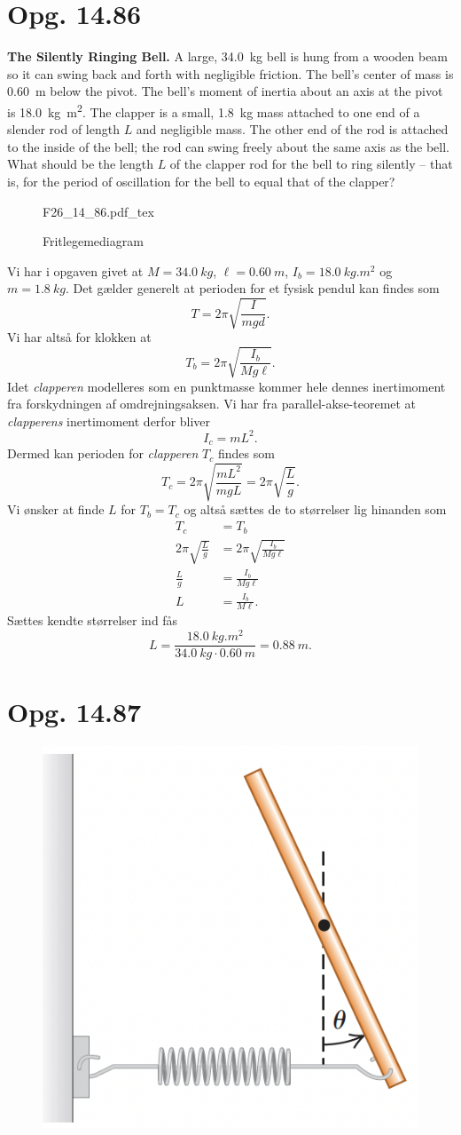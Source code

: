 \documentclass[12pt]{article}
\newcommand{\incfig}[2][1]{%
  \def\svgwidth{#1\columnwidth}
  {#2.pdf_tex}
}
\theoremstyle{definition}
\begin{document}
\section*{Opg. 14.86}
\textbf{The Silently Ringing Bell.} A large, \qty{34,0}{kg}  bell is hung from a wooden beam so it can swing back and forth with negligible friction. The bell's center of mass is \qty{0,60}{m} below the pivot. The bell's moment of inertia about an axis at the pivot is \qty{18,0}{kg.m^2}. The clapper is a small, \qty{1,8}{kg} mass attached to one end of a slender rod of length $L$ and negligible mass. The other end of the rod is attached to the inside of the bell; the rod can swing freely about the same axis as the bell. What should be the length $L$ of the clapper rod for the bell to ring silently -- that is, for the period of oscillation for the bell to equal that of the clapper?
\begin{figure}[ht]
  \centering
  \incfig[0.3]{F26_14_86}
  \caption{Fritlegemediagram}
  \label{fig:F26_14_86}
\end{figure}
\bigbreak
Vi har i opgaven givet at $M = \qty{34,0}{kg}$, $\ell = \qty{0,60}{m}$, $I_b = \qty{18,0}{kg.m^2}$ og $m = \qty{1,8}{kg}$. Det gælder generelt at perioden for et fysisk pendul kan findes som
\[ 
T = 2\pi \sqrt{\frac{I}{mgd}}
.\]
Vi har altså for klokken at
\[ 
T_b = 2\pi \sqrt{\frac{I_b}{Mg \ell}}
.\]
Idet \textit{clapperen} modelleres som en punktmasse kommer hele dennes inertimoment fra forskydningen af omdrejningsaksen. Vi har fra parallel-akse-teoremet at \textit{clapperens} inertimoment derfor bliver
\[ 
I_c = mL^2
.\]
Dermed kan perioden for \textit{clapperen} $T_c$ findes som
\[ 
T_c = 2\pi \sqrt{\frac{mL^2}{mgL}} = 2\pi \sqrt{\frac{L}{g}}
.\]
Vi ønsker at finde $L$ for $T_b = T_c$ og altså sættes de to størrelser lig hinanden som
\begin{align*}
  T_c &= T_b \\
  2\pi \sqrt{\frac{L}{g}} &= 2\pi \sqrt{\frac{I_b}{Mg\ell}} \\
  \frac{L}{g} &= \frac{I_b}{Mg\ell} \\
  L &= \frac{I_b}{M\ell}
.\end{align*}
Sættes kendte størrelser ind fås
\[ 
L = \frac{\qty{18,0}{kg.m^2}}{\qty{34,0}{kg} \cdot \qty{0,60}{m}} = \qty{0,88}{m} 
.\]


\section*{Opg. 14.87}
\begin{figure} [ht]
  \centering
  \caption{}
  \includegraphics[width=0.2\linewidth]{../figures/P14_87.png}
  \label{fig:P14_87}
\end{figure}
\end{document}
